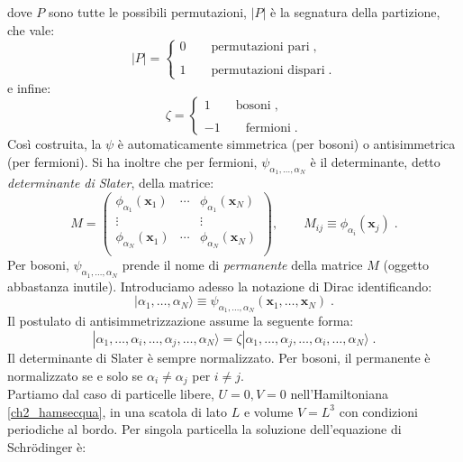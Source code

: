 \documentclass[10pt,a4paper]{report}
\theoremstyle{definition}
\numberwithin{equation}{section}
\newcommand{\ket}{\rangle}
\newcommand{\Sch}{Schrödinger}
\begin{document}
dove $P$ sono tutte le possibili permutazioni, $|P|$ è la segnatura della partizione, che vale:
\begin{equation}
|P|=\begin{cases}
0\qquad \mbox{permutazioni pari}\;, \\
\\
1\qquad\mbox{permutazioni dispari}\;.
\end{cases}
\end{equation}
e infine:
\begin{equation}
\zeta=\begin{cases}
1\qquad \mbox{bosoni}\;,\\
\\
-1\qquad \mbox{fermioni}\;.
\end{cases}
\end{equation}
Così costruita, la $\psi$ è automaticamente simmetrica (per bosoni) o antisimmetrica (per fermioni). Si ha inoltre che per fermioni, $\psi_{\alpha_1,\ldots,\alpha_N}$ è il determinante, detto \emph{determinante di Slater}, della matrice:
\begin{equation}
M=\left(\begin{matrix}
\phi_{\alpha_1}(\mathbf{x}_1) & \cdots & \phi_{\alpha_1}(\mathbf{x}_N) \\
\vdots & {} & \vdots \\
\phi_{\alpha_N}(\mathbf{x}_1) & \cdots & \phi_{\alpha_N}(\mathbf{x}_N) \\
\end{matrix}\right),\qquad M_{ij}\equiv \phi_{\alpha_i}(\mathbf{x}_j)\;.
\end{equation}
Per bosoni, $\psi_{\alpha_1,\ldots,\alpha_N}$ prende il nome di \emph{permanente} della matrice $M$ (oggetto abbastanza inutile). Introduciamo adesso la notazione di Dirac identificando:
\begin{equation}
|\alpha_1,\ldots,\alpha_N\ket \equiv \psi_{\alpha_1,\ldots,\alpha_N}(\mathbf{x}_1,\ldots,\mathbf{x}_N)\;.
\end{equation}
Il postulato di antisimmetrizzazione assume la seguente forma:
\begin{equation}
|\alpha_1,\ldots,\alpha_i,\ldots,\alpha_j,\ldots,\alpha_N\ket =\zeta|\alpha_1,\ldots,\alpha_j,\ldots,\alpha_i,\ldots,\alpha_N\ket\;.
\end{equation}
Il determinante di Slater è sempre normalizzato. Per bosoni, il permanente è normalizzato se e solo se $\alpha_i\ne\alpha_j$ per $i\ne j$. \\
Partiamo dal caso di particelle libere, $U=0,V=0$ nell'Hamiltoniana \eqref{ch2_hamsecqua}, in una scatola di lato $L$ e volume $V=L^3$ con condizioni periodiche al bordo. Per singola particella la soluzione dell'equazione di \Sch\; è:
\end{document}
